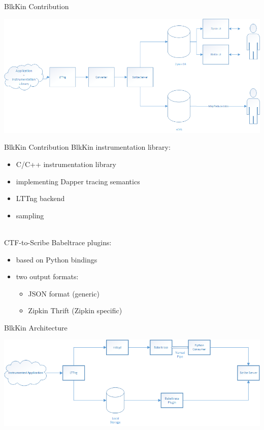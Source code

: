 \begin{frame}{BlkKin Contribution}
\begin{center}
\includegraphics[scale=0.45]{images/step3.png}
\end{center}
\end{frame}

\begin{frame}{BlkKin Contribution}
BlkKin instrumentation library:
\begin{itemize}
\item C/C++ instrumentation library
\item implementing Dapper tracing semantics
\item LTTng backend
\item sampling
\end{itemize}

\hfill \\
CTF-to-Scribe Babeltrace plugins:
\begin{itemize}
\item based on Python bindings
\item two output formats: 
    \begin{itemize}
    \item JSON format (generic)
    \item Zipkin Thrift (Zipkin specific)
    \end{itemize}
\end{itemize}
\end{frame}

\begin{frame}{BlkKin Architecture}
\begin{center}
\includegraphics[scale=0.52]{images/blkin-internal.png}
\end{center}
\end{frame}

